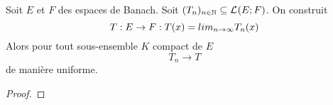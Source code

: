 \begin{corollary}
	Soit $E$ et $F$ des espaces de Banach.
	Soit $(T_{n})_{n \in \mathbb{N}} \subseteq \mathcal{L}_{}(E; F)$. On
	construit
	\begin{equation}
		T : E \rightarrow F : T(x) = lim_{n \rightarrow \infty} T_{n}(x)
	\end{equation}
	Alors pour tout sous-ensemble $K$ compact de $E$
	\begin{equation}
		T_{n} \rightarrow T
	\end{equation}
	de manière uniforme.
\end{corollary}

\ifdefined\outputproof
\begin{proof}

\end{proof}
\fi
